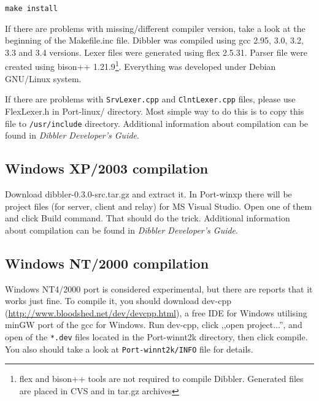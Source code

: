 \begin{verbatim}
make install
\end{verbatim}

If there are problems with missing/different compiler
version, take a look at the beginning of the Makefile.inc
file. Dibbler was compiled using gcc 2.95, 3.0, 3.2, 3.3 and 3.4
versions. Lexer files were generated using flex 2.5.31. Parser file
were created using bison++ 1.21.9\footnote{flex and bison++ tools are
  not required to compile Dibbler. Generated files are placed in CVS
  and in tar.gz archives}. Everything was developed under Debian
GNU/Linux system.

If there are problems with \verb+SrvLexer.cpp+ and
\verb+ClntLexer.cpp+ files, please use FlexLexer.h in Port-linux/
directory. Most simple way to do this is to copy this file to
\verb+/usr/include+ directory. Additional information about
compilation can be found in \emph{Dibbler Developer's Guide}.

\subsection{Windows XP/2003 compilation}
Download dibbler-0.3.0-src.tar.gz and extract it. In Port-winxp there
will be project files (for server, client and relay) for MS
Visual Studio. Open one of them and click Build command. That should
do the trick. Additional information about compilation can be found in
\emph{Dibbler Developer's Guide}.

\subsection{Windows NT/2000 compilation}
Windows NT4/2000 port is considered experimental, but there are reports
that it works just fine. To compile it, you should download dev-cpp
(\url{http://www.bloodshed.net/dev/devcpp.html}), a free IDE for
Windows utilising minGW port of the gcc for Windows. Run dev-cpp,
click ,,open project...'', and open of the \verb+*.dev+ files located
in the Port-winnt2k directory, then click compile. You also should
take a look at \verb+Port-winnt2k/INFO+ file for details.
